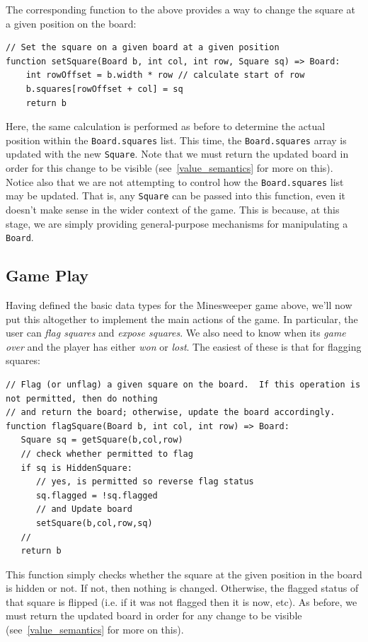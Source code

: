 The corresponding function to the above provides a way to change the square at a given position on the board:

\begin{lstlisting}
// Set the square on a given board at a given position
function setSquare(Board b, int col, int row, Square sq) => Board:
    int rowOffset = b.width * row // calculate start of row
    b.squares[rowOffset + col] = sq
    return b
\end{lstlisting}

Here, the same calculation is performed as before to determine the actual position within the \lstinline{Board.squares} list.  This time, the \lstinline{Board.squares} array is updated with the new \lstinline{Square}.  Note that we must return the updated board in order for this change to be visible (see~\ref{value_semantics} for more on this).  Notice also that we are not attempting to control how the \lstinline{Board.squares} list may be updated.  That is, any \lstinline{Square} can be passed into this function, even it doesn't make sense in the wider context of the game.  This is because, at this stage, we are simply providing general-purpose mechanisms for manipulating a \lstinline{Board}.

\subsection{Game Play}

Having defined the basic data types for the Minesweeper game above, we'll now put this altogether to implement the main actions of the game.  In particular, the user can {\em flag squares} and {\em expose squares}.  We also need to know when its {\em game over} and the player has either {\em won} or {\em lost}.  The easiest of these is that for flagging squares:

\begin{lstlisting}
// Flag (or unflag) a given square on the board.  If this operation is not permitted, then do nothing
// and return the board; otherwise, update the board accordingly.
function flagSquare(Board b, int col, int row) => Board:
   Square sq = getSquare(b,col,row)
   // check whether permitted to flag
   if sq is HiddenSquare:
      // yes, is permitted so reverse flag status
      sq.flagged = !sq.flagged
      // and Update board
      setSquare(b,col,row,sq)
   //
   return b
\end{lstlisting}

This function simply checks whether the square at the given position in the board is hidden or not.  If not, then nothing is changed.  Otherwise, the flagged status of that square is flipped (i.e. if it was not flagged then it is now, etc).  As before,  we must return the updated board in order for any change to be visible (see~\ref{value_semantics} for more on this).